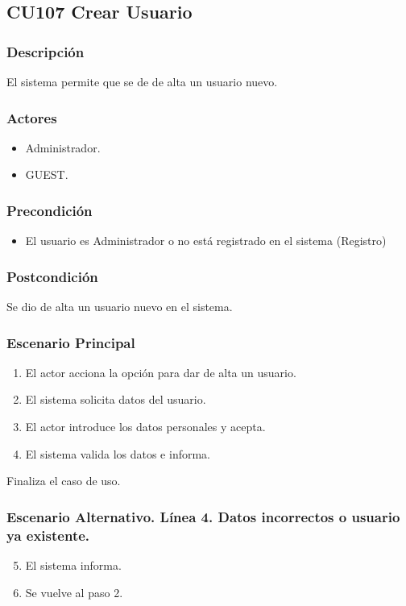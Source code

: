 \subsection{CU107 Crear Usuario}
\subsubsection{Descripci\'{o}n}
El sistema permite que se de de alta un usuario nuevo.
\subsubsection{Actores}
\begin{itemize}
\item Administrador.
\item GUEST.
\end{itemize}
\subsubsection{Precondici\'{o}n}
\begin{itemize}
\item El usuario es Administrador o no est\'{a} registrado en el sistema (Registro)
\end{itemize}
\subsubsection{Postcondici\'{o}n}
Se dio de alta un usuario nuevo en el sistema.
\subsubsection{Escenario Principal}
\begin{enumerate}
\item El actor acciona la opci\'{o}n para dar de alta un usuario.
\item El sistema solicita datos del usuario.
\item El actor introduce los datos personales y acepta.
\item El sistema valida los datos e informa.
\end{enumerate}
Finaliza el caso de uso.
\subsubsection{Escenario Alternativo. L\'{i}nea 4. Datos incorrectos o usuario ya existente.}
\begin{enumerate}
\setcounter{enumi}{4}
\item El sistema informa.
\item Se vuelve al paso 2.
\end{enumerate}
